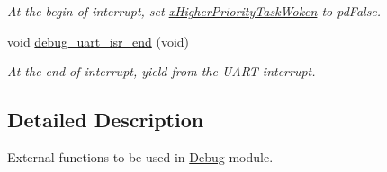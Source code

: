 \begin{DoxyCompactItemize}
\begin{DoxyCompactList}\small\item\em At the begin of interrupt, set \hyperlink{group___debug___private___variables_ga9d9a749ad99ec3d4a6886d5277b9ba87}{x\+Higher\+Priority\+Task\+Woken} to pd\+False. \end{DoxyCompactList}\item 
void \hyperlink{group___debug___u_a_r_t___external___functions_ga3f4c952ea2b6368ccbb0572addd76601}{debug\+\_\+uart\+\_\+isr\+\_\+end} (void)\hypertarget{group___debug___u_a_r_t___external___functions_ga3f4c952ea2b6368ccbb0572addd76601}{}\label{group___debug___u_a_r_t___external___functions_ga3f4c952ea2b6368ccbb0572addd76601}

\begin{DoxyCompactList}\small\item\em At the end of interrupt, yield from the U\+A\+RT interrupt. \end{DoxyCompactList}\end{DoxyCompactItemize}


\subsection{Detailed Description}
External functions to be used in \hyperlink{group___debug}{Debug} module. 

